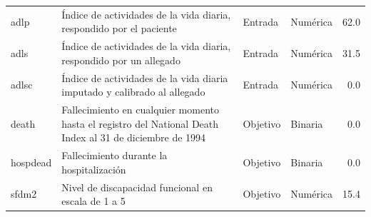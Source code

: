 \begin{longtable}{p{1.7cm} p{5.1cm} p{1.4cm} p{1.6cm} r}
adlp & Índice de actividades de la vida diaria, respondido por el paciente & Entrada & Numérica & 62.0 \\
adls & Índice de actividades de la vida diaria, respondido por un allegado & Entrada & Numérica & 31.5 \\
adlsc & Índice de actividades de la vida diaria imputado y calibrado al allegado & Entrada & Numérica & 0.0 \\
death & Fallecimiento en cualquier momento hasta el registro del National Death Index al 31 de diciembre de 1994 & Objetivo & Binaria & 0.0 \\
hospdead & Fallecimiento durante la hospitalización & Objetivo & Binaria & 0.0 \\
sfdm2 & Nivel de discapacidad funcional en escala de 1 a 5 & Objetivo & Numérica & 15.4 \\
\end{longtable}
